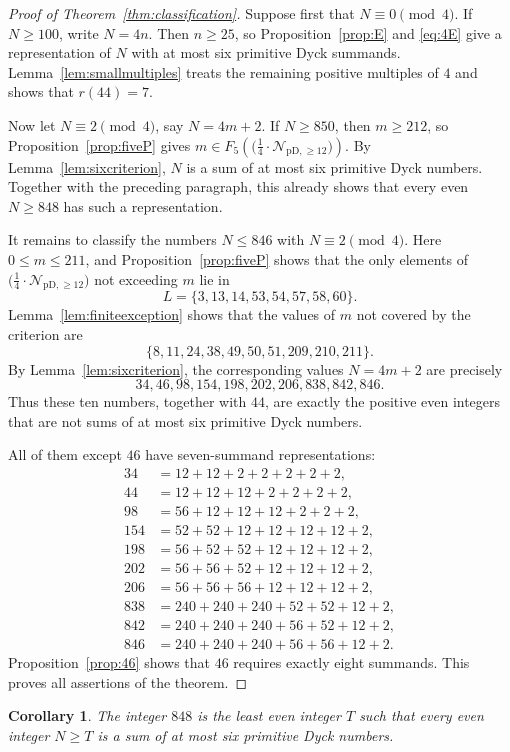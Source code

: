 \documentclass[12pt]{article}
\theoremstyle{plain}
\newtheorem{corollary}[theorem]{Corollary}
\theoremstyle{definition}
\theoremstyle{plain}
\newcommand{\Pset}{%
  \bigl(\tfrac{1}{4}\cdot\mathcal{N}_{\mathrm{pD},\geq 12}\bigr)%
}
\begin{document}
\begin{proof}[Proof of Theorem~\ref{thm:classification}]
Suppose first that $N\equiv0\pmod 4$.  If $N\geq100$, write $N=4n$.
Then $n\geq25$, so Proposition~\ref{prop:E} and \eqref{eq:4E} give a
representation of $N$ with at most six primitive Dyck summands.
Lemma~\ref{lem:smallmultiples} treats the remaining positive multiples
of $4$ and shows that $r(44)=7$.

Now let $N\equiv2\pmod 4$, say $N=4m+2$.  If $N\geq850$, then $m\geq212$,
so Proposition~\ref{prop:fiveP} gives $m\in F_5(\Pset)$.  By
Lemma~\ref{lem:sixcriterion}, $N$ is a sum of at most six primitive
Dyck numbers.  Together with the preceding paragraph, this already
shows that every even $N\geq848$ has such a representation.

It remains to classify the numbers $N\leq846$ with $N\equiv2\pmod 4$.
Here $0\leq m\leq211$, and Proposition~\ref{prop:fiveP} shows that the
only elements of $\Pset$ not exceeding $m$ lie in
\[
 L=\{3,13,14,53,54,57,58,60\}.
\]
Lemma~\ref{lem:finiteexception} shows that the values of $m$ not
covered by the criterion are
\[
 \{8,11,24,38,49,50,51,209,210,211\}.
\]
By Lemma~\ref{lem:sixcriterion}, the corresponding values $N=4m+2$
are precisely
\[
 34,46,98,154,198,202,206,838,842,846.
\]
Thus these ten numbers, together with $44$, are exactly the positive
even integers that are not sums of at most six primitive Dyck numbers.

All of them except $46$ have seven-summand representations:
\[
\begin{aligned}
34&=12+12+2+2+2+2+2,\\
44&=12+12+12+2+2+2+2,\\
98&=56+12+12+12+2+2+2,\\
154&=52+52+12+12+12+12+2,\\
198&=56+52+52+12+12+12+2,\\
202&=56+56+52+12+12+12+2,\\
206&=56+56+56+12+12+12+2,\\
838&=240+240+240+52+52+12+2,\\
842&=240+240+240+56+52+12+2,\\
846&=240+240+240+56+56+12+2.
\end{aligned}
\]
Proposition~\ref{prop:46} shows that $46$ requires exactly eight
summands.  This proves all assertions of the theorem.
\end{proof}

\begin{corollary}\label{cor:threshold}
The integer $848$ is the least even integer $T$ such that every even
integer $N\geq T$ is a sum of at most six primitive Dyck numbers.
\end{corollary}
\end{document}
